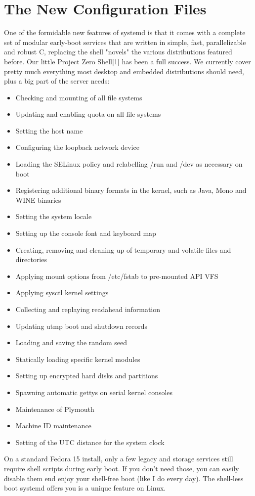\documentclass[titlepage]{article}
\begin{document}
\section{The New Configuration Files}
One of the formidable new features of systemd is that it comes with a complete set of modular early-boot services that are written in simple, fast, parallelizable and robust C, replacing the shell "novels" the various distributions featured before. Our little Project Zero Shell[1] has been a full success. We currently cover pretty much everything most desktop and embedded distributions should need, plus a big part of the server needs:
\begin{itemize}
\item Checking and mounting of all file systems
\item Updating and enabling quota on all file systems
\item Setting the host name
\item Configuring the loopback network device
\item Loading the SELinux policy and relabelling /run and /dev as necessary on boot
\item Registering additional binary formats in the kernel, such as Java, Mono and WINE binaries
\item Setting the system locale
\item Setting up the console font and keyboard map
\item Creating, removing and cleaning up of temporary and volatile files and directories
\item Applying mount options from /etc/fstab to pre-mounted API VFS
\item Applying sysctl kernel settings
\item Collecting and replaying readahead information
\item Updating utmp boot and shutdown records
\item Loading and saving the random seed
\item Statically loading specific kernel modules
\item Setting up encrypted hard disks and partitions
\item Spawning automatic gettys on serial kernel consoles
\item Maintenance of Plymouth
\item Machine ID maintenance
\item Setting of the UTC distance for the system clock
\end{itemize}
On a standard Fedora 15 install, only a few legacy and storage services still require shell scripts during early boot. If you don't need those, you can easily disable them end enjoy your shell-free boot (like I do every day). The shell-less boot systemd offers you is a unique feature on Linux.
\end{document}
